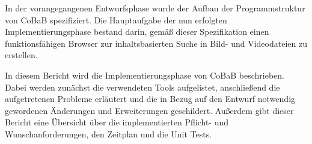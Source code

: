 In der vorangegangenen Entwurfsphase wurde der Aufbau der Programmstruktur von CoBaB spezifiziert. Die Hauptaufgabe der nun erfolgten Implementierungsphase bestand darin, gemäß dieser Spezifikation einen funktionsfähigen Browser zur inhaltsbasierten Suche in Bild- und Videodateien zu erstellen. 

In diesem Bericht wird die Implementierungsphase von CoBaB beschrieben. \newline
Dabei werden zunächst die verwendeten Tools aufgelistet, anschließend die aufgetretenen Probleme erläutert und die in Bezug auf den Entwurf notwendig gewordenen Änderungen und Erweiterungen geschildert. \newline
Außerdem gibt dieser Bericht eine Übersicht über die implementierten Pflicht- und Wunschanforderungen, den Zeitplan und die Unit Tests.